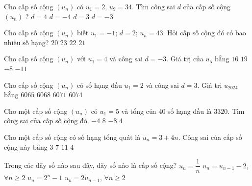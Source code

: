\begin{ex}%
 Cho cấp số cộng $(u_n)$ có $u_1=2$, $u_9=34$. Tìm công sai $d$ của cấp số cộng $(u_n)$ ?
 \choice
 {\True $d=4$}
 {$d=-4$}
 {$d=3$}
 {$d=-3$}
\end{ex}
\begin{ex}%
 Cho cấp số cộng $(u_n)$ biết $u_1=-1$; $d=2$; $u_n=43$. Hỏi cấp số cộng đó có bao nhiêu số hạng?
 \choice
 {$20$}
 {\True $23$}
 {$22$}
 {$21$}
\end{ex}
\begin{ex}%
 Cho cấp số cộng $(u_n)$ với $u_1=4$ và công sai $d=-3$. Giá trị của $u_5$ bằng
 \choice
 {$16$}
 {$19$}
 {\True $-8$}
 {$-11$}
\end{ex}
\begin{ex}%
 Cho cấp số cộng $(u_n)$ có số hạng đầu $u_1=2$ và công sai $d=3$. Giá trị $u_{2024}$ bằng
 \choice
 {$6065$}
 {$6068$}
 {\True $6071$}
 {$6074$}
\end{ex}
\begin{ex}%
 Cho một cấp số cộng $\left(u_n\right)$ có $u_1=5$ và tổng của 40 số hạng đầu là $3320$. Tìm công sai của cấp số cộng đó.
 \choice
 {$-4$}
 {$8$}
 {$-8$}
 {\True $4$}
 \end{ex}
\begin{ex}%
 Cho một cấp số cộng có số hạng tổng quát là $ u_{n}=3+4 n$. Công sai của cấp số cộng này bằng
 \choice
 {$3$}
 {$7$}
 {$11$}
 {\True $4$}
\end{ex}
\begin{ex}%
 Trong các dãy số nào sau đây, dãy số nào là cấp số cộng?
 \choice
 {$u_n=\dfrac{1}{n}$}
 {\True $u_n=u_{n-1}-2$, $\forall n \ge 2$}
 {$u_n=2^n-1$}
 {$u_n=2u_{n-1}$, $\forall n \ge 2$}
\end{ex}

